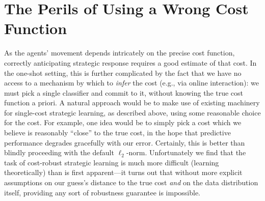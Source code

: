 \documentclass{article}
\theoremstyle{definition}
\begin{document}
\section{The Perils of Using a Wrong Cost Function}
\label{sec:wrong-cost-difficulty}

As the agents' movement depends intricately on the precise cost function, correctly anticipating strategic response requires a good estimate of that cost. In the one-shot setting, this is further complicated by the fact that we have no access to a mechanism by which to \emph{infer} the cost (e.g., via online interaction):
we must pick a single classifier and commit to it,
without knowing the true cost function a priori.
A natural approach would be to make use of existing machinery for single-cost strategic learning, as described above, 
using some reasonable choice for the cost.
For example, one idea would be to simply pick a cost which we believe is reasonably ``close'' to the true cost, in the hope that predictive performance degrades gracefully with our error.
Certainly, this is better than blindly proceeding with the default $\ell_2$-norm. Unfortunately we find that the task of cost-robust strategic learning is much more difficult (learning theoretically) than is first apparent---it turns out that without more explicit assumptions on our guess's distance to the true cost \emph{and} on the data distribution itself, providing any sort of robustness guarantee is impossible.
\end{document}
